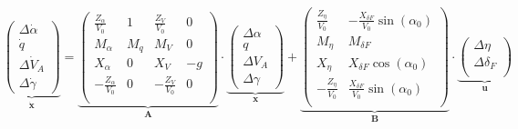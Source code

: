 \begin{equation}\label{eq:laengsbewegung}
	\underbrace{\begin{pmatrix}
		\Delta \dot \alpha\\
		\dot q\\
		\Delta \dot V_A\\
		\Delta \dot \gamma
	\end{pmatrix}}_{\mathbf{\dot x}} = 
	\underbrace{\begin{pmatrix}
		\frac{Z_\alpha}{V_0} & 1 & \frac{Z_V}{V_0} & 0\\
		M_\alpha & M_q & M_V & 0\\
		X_\alpha & 0 & X_V & -g\\
		-\frac{Z_\alpha}{V_0} & 0 & -\frac{Z_V}{V_0} & 0\\
	\end{pmatrix}}_{\mathbf{A}} \cdot
	\underbrace{\begin{pmatrix}
		\Delta \alpha\\
		q\\
		\Delta V_A\\
		\Delta \gamma
	\end{pmatrix}}_{\mathbf{x}} + 
	\underbrace{\begin{pmatrix}
		\frac{Z_\eta}{V_0} & -\frac{X_{\delta F}}{V_0} \sin{(\alpha_0)}\\
		M_\eta & M_{\delta F}\\
		X_\eta & X_{\delta F} \cos{(\alpha_0)}\\
		-\frac{Z_\eta}{V_0} & \frac{X_{\delta F}}{V_0} \sin{(\alpha_0)}\\
	\end{pmatrix}}_{\mathbf{B}}\cdot
	\underbrace{\begin{pmatrix}
		\Delta \eta\\
		\Delta \delta_F\\
	\end{pmatrix}}_{\mathbf{u}}
\end{equation}

